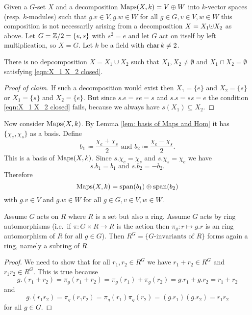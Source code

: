 \begin{expl}
 Given a $G$-set $X$ and a decomposition $\operatorname{Maps}(X,k) = V \oplus W$ into $k$-vector spaces (resp. $k$-modules) such that $g.v \in V, g.w \in W$ for all $g \in G, v \in V, w \in W$ this composition is not necessarily arising from a decomposition $X = X_1 \dotcup X_2$ as above.
 Let $G = \mathbb{Z}/2 = \{e,s\}$ with $s^2 = e$ and let $G$ act on itself by left multiplication, so $X = G$. Let $k$ be a field with $\operatorname{char} k \neq 2$.
 \begin{claim}
  There is no depcomposition $X = X_1 \cup X_2$ such that $X_1, X_2 \neq \emptyset$ and $X_1 \cap X_2 = \emptyset$ satisfying \eqref{eqn:X_1 X_2 closed}.
 \end{claim}
 \begin{proof}[Proof of claim]
  If such a decomposition would exist then $X_1 = \{e\}$ and $X_2 = \{s\}$ or $X_1 = \{s\}$ and $X_2 = \{e\}$. But since $s.e = se = s$ and $s.s = ss = e$ the condition \eqref{eqn:X_1 X_2 closed} fails, because we always have $s(X_1) \subseteq X_2$.
 \end{proof}
 Now consider $\operatorname{Maps}(X,k)$. By Lemma \ref{lem: basis of Maps and Hom} it has $\{\chi_e,\chi_s\}$ as a basis. Define
 \[
  b_1 \coloneqq \frac{\chi_e + \chi_s}{2} \text{ and } b_2 \coloneqq \frac{\chi_e - \chi_s}{2}.
 \]
 This is a basis of $\operatorname{Maps}(X,k)$. Since $s.\chi_e = \chi_s$ and $s.\chi_s = \chi_e$ we have
 \[
  s.b_1 = b_1 \text{ and } s.b_2 = -b_2.
 \]
 Therefore
 \[
  \operatorname{Maps}(X,k) = \operatorname{span}(b_1) \oplus \operatorname{span}(b_2)
 \]
 with $g.v \in V$ and $g.w \in W$ for all $g \in G, v \in V, w \in W$.
\end{expl}


\begin{lem}\label{lem: group action by ring automorphisms}
 Assume $G$ acts on $R$ where $R$ is a set but also a ring. Assume $G$ acts by ring automorphisms (i.e.\ if $\pi \colon G \times R \to R$ is the action then $\pi_g \colon r \mapsto g.r$ is an ring automorphism of $R$ for all $g \in G$). Then $R^G = \{\text{$G$-invariants of $R$}\}$ forms again a ring, namely a subring of $R$.
\end{lem}
\begin{proof}
 We need to show that for all $r_1, r_2 \in R^G$ we have $r_1 + r_2 \in R^G$ and $r_1 r_2 \in R^G$. This is true because
 \[
  g.(r_1 + r_2) = \pi_g(r_1 + r_2) = \pi_g(r_1) + \pi_g(r_2) = g.r_1 + g.r_2 = r_1 + r_2
 \]
 and
 \[
  g.(r_1 r_2) = \pi_g(r_1 r_2) = \pi_g(r_1) \pi_g(r_2) = (g.r_1)(g.r_2) = r_1 r_2
 \]
 for all $g \in G$.
\end{proof}


